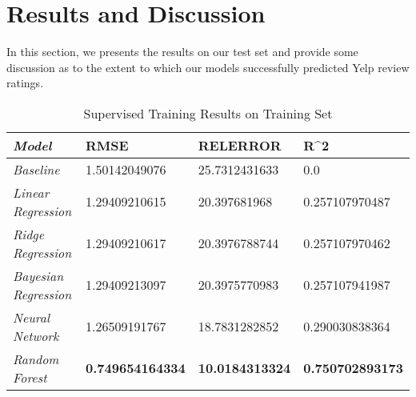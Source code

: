 \documentclass[letterpaper, 10 pt, conference]{ieeeconf}  %
\begin{document}
\section{Results and Discussion}
In this section, we presents the results on our test set and provide some discussion as to the extent to which our models successfully predicted Yelp review ratings.

{\renewcommand{\arraystretch}{2}%
\begin{table*}[]
\centering
\caption{Supervised Training Results on Training Set}
\label{table:trainint_set_results}
\begin{tabular}{|l|lll}
\hline
\textit{\textbf{Model}}      & \multicolumn{1}{l|}{\textbf{RMSE}} & \multicolumn{1}{l|}{\textbf{RELERROR}} & \multicolumn{1}{l|}{\textbf{R\textasciicircum 2}} \\ \hline
\textit{Baseline}            & 1.50142049076                      & 25.7312431633                          & 0.0                                               \\ \cline{1-1}
\textit{Linear Regression}   & 1.29409210615                      & 20.397681968                           & 0.257107970487                                    \\ \cline{1-1}
\textit{Ridge Regression}    & 1.29409210617                      & 20.3976788744                          & 0.257107970462                                    \\ \cline{1-1}
\textit{Bayesian Regression} & 1.29409213097                      & 20.3975770983                          & 0.257107941987                                    \\ \cline{1-1}
\textit{Neural Network}      & 1.26509191767                      & 18.7831282852                          & 0.290030838364                                    \\ \cline{1-1}
\textit{Random Forest}       & \textbf{0.749654164334}            & \textbf{10.0184313324}                 & \textbf{0.750702893173}                           \\ \cline{1-1}
\end{tabular}
\end{table*}
}

\end{document}
